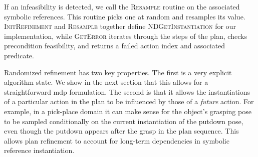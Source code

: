If an infeasibility is detected, we call the \textsc{Resample} routine on the
associated symbolic references. This routine picks one at random and
resamples its value. \textsc{InitRefinement} and \textsc{Resample} together define
\textsc{NDGetInstantiation} for our implementation, while \textsc{GetError} iterates
through the steps of the plan, checks precondition feasibility, and returns
a failed action index and associated predicate.

Randomized refinement has two key properties. The first is a very
explicit algorithm state.  We show in the next section that this
allows for a straightforward {\sc mdp} formulation. The second is that
it allows the instantiations of a particular action in the plan to be
influenced by those of a \emph{future} action. For example, in a
pick-place domain it can make sense for the object's grasping pose to
be sampled conditionally on the current instantiation of the putdown
pose, even though the putdown appears after the grasp in the plan
sequence. This allows plan refinement to account for long-term
dependencies in symbolic reference instantiation.

